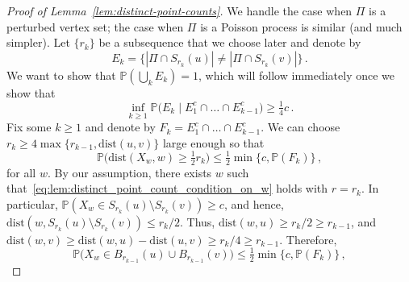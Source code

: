 \documentclass[10pt,a4paper]{amsart}
\def\P{\mathbb{P}}
\begin{document}
\begin{proof}[Proof of Lemma~\ref{lem:distinct-point-counts}]
    We handle the case when $\Pi$ is a perturbed vertex set; the case when $\Pi$ is a Poisson process is similar (and much simpler).    
    Let $\{r_k\}$ be a subsequence that we choose later and denote by 
    \[
    E_k = \big\{ |\Pi\cap S_{r_k}(u)| \neq |\Pi\cap S_{r_k}(v)| \big\} \, .
    \]
    We want to show that $ \P(\bigcup_{k} E_k ) = 1$, which will follow immediately once we show that 
    \begin{equation} \label{eq:proof_of_lemma_distinct_points_lower_bound_on_conditional_prob}
        \inf_{k\ge 1} \P\big( E_k \mid E_1^c\cap \ldots \cap E_{k-1}^c \big) \ge \tfrac14 c \, .
    \end{equation}
    Fix some $k\ge 1$ and denote by $F_k = E_1^c\cap \ldots \cap E_{k-1}^c$. We can choose $r_k \ge 4 \max\{ r_{k-1}, \text{dist}(u,v)\}$ large enough so that 
    \begin{equation*}
        \P \big(\text{dist}(X_w,w) \ge \tfrac12 r_k \big) \le \tfrac12 \min\{c,\P(F_k)\} \, ,
    \end{equation*}
    for all $w$. By our assumption, there exists $w$ such that~\eqref{eq:lem:distinct_point_count_condition_on_w} holds with $r=r_k$.
    In particular, $\P(X_w \in S_{r_k}(u) \setminus S_{r_k}(v)) \ge c$, and hence, $\text{dist}(w, S_{r_k}(u) \setminus S_{r_k}(v)) \le r_k/2$. Thus, $\text{dist}(w,u) \ge r_k/2 \ge r_{k-1}$, and $\text{dist}(w,v) \ge \text{dist}(w,u) - \text{dist}(u,v) \ge r_k/4 \ge r_{k-1}$.
    Therefore,
    \begin{equation} \label{eq:proof_of_lemma_distinct_point_choice_of_r_k}
        \P \big(X_w \in B_{r_{k-1}}(u) \cup B_{r_{k-1}}(v) \big) \le \tfrac12 \min\{c,\P(F_k)\} \, ,
    \end{equation}
    

\end{proof}
\end{document}
